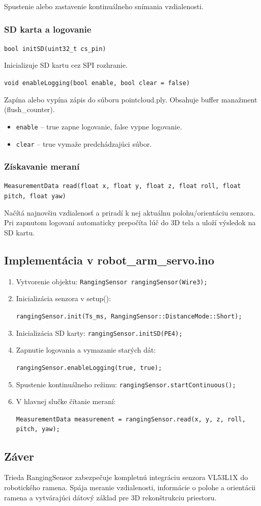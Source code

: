 Spustenie alebo zastavenie kontinuálneho snímania vzdialenosti.

\subsubsection{SD karta a logovanie}

\texttt{bool initSD(uint32\_t cs\_pin)}

Inicializuje SD kartu cez SPI rozhranie.

\texttt{void enableLogging(bool enable, bool clear = false)}

Zapína alebo vypína zápis do súboru pointcloud.ply. Obsahuje buffer manažment (flush\_counter).

\begin{itemize}
	\item \texttt{enable} -- true zapne logovanie, false vypne logovanie.
	\item \texttt{clear} -- true vymaže predchádzajúci súbor.
\end{itemize}

\subsubsection{Získavanie meraní}

\texttt{MeasurementData read(float x, float y, float z, float roll, float pitch, float yaw)}

Načítá najnovšiu vzdialenosť a priradí k nej aktuálnu polohu/orientáciu senzora. Pri zapnutom logovaní automaticky prepočíta lúč do 3D tela a uloží výsledok na SD kartu.

\subsection{Implementácia v robot\_arm\_servo.ino}

\begin{enumerate}
	\item Vytvorenie objektu: \texttt{RangingSensor rangingSensor(Wire3);}
	\item Inicializácia senzora v setup(): 
	
    \texttt{rangingSensor.init(Ts\_ms, RangingSensor::DistanceMode::Short);}
	\item Inicializácia SD karty: \texttt{rangingSensor.initSD(PE4);}
	\item Zapnutie logovania a vymazanie starých dát: 
    
    \texttt{rangingSensor.enableLogging(true, true);}
	\item Spustenie kontinuálneho režimu: \texttt{rangingSensor.startContinuous();}
	\item V hlavnej slučke čítanie meraní: 
    
    \texttt{MeasurementData measurement = rangingSensor.read(x, y, z, roll, pitch, yaw);}
\end{enumerate}

\subsection{Záver}

Trieda RangingSensor zabezpečuje kompletnú integráciu senzora VL53L1X do robotického ramena. Spája meranie vzdialenosti, informácie o polohe a orientácii ramena a vytvárajúci dátový základ pre 3D rekonštrukciu priestoru.
